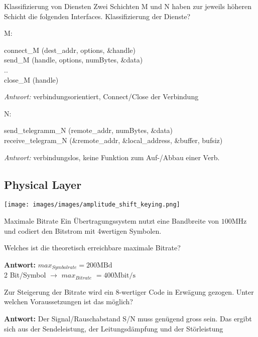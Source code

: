 \begin{example2}{Klassifizierung von Diensten}
  Zwei Schichten M und N haben zur jeweils höheren Schicht die folgenden Interfaces. Klassifizierung der Dienste?

  \vspace{1mm}

  M:

connect\_M (dest\_addr, options, \&handle)\\
send\_M (handle, options, numBytes, \&data)\\
..\\
close\_M (handle)

\emph{Antwort:} verbindungsorientiert, Connect/Close der Verbindung

\vspace{1mm}

N:

send\_telegramm\_N (remote\_addr, numBytes, \&data)\\
receive\_telegram\_N (\&remote\_addr, \&local\_address, \&buffer, bufsiz)

\emph{Antwort:} verbindungslos, keine Funktion zum Auf-/Abbau einer Verb.
\end{example2}

\subsection*{Physical Layer}

\begin{example}
    \texttt{[image: images/images/amplitude\_shift\_keying.png]}
\end{example}

\begin{example2}{Maximale Bitrate}
  Ein Übertragungssystem nutzt eine Bandbreite von $100 \mathrm{MHz}$ und codiert den Bitstrom mit 4wertigen Symbolen.
 
  Welches ist die theoretisch erreichbare maximale Bitrate?
 
 \textbf{Antwort:}
 $max_{Symbolrate} =200 \mathrm{MBd}$\\
 2 Bit/Symbol $\rightarrow$ $max_{Bitrate}$ $=400 \mathrm{Mbit} / \mathrm{s}$
 
 \vspace{2mm}
 
 Zur Steigerung der Bitrate wird ein 8-wertiger Code in Erwägung gezogen. Unter welchen Voraussetzungen ist das möglich?
 
 \textbf{Antwort:}
 Der Signal/Rauschabstand S/N muss genügend gross sein. Das ergibt sich aus der Sendeleistung, der Leitungsdämpfung und der Störleistung
 \end{example2}


